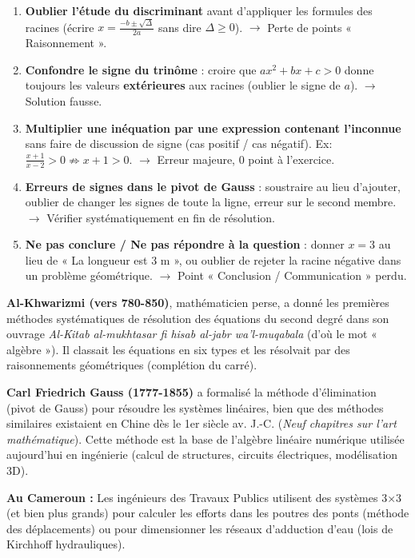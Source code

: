 \documentclass[11pt]{article}
\begin{document}
\begin{attention}
\begin{enumerate}
\item \textbf{Oublier l'étude du discriminant} avant d'appliquer les formules des racines (écrire $x = \frac{-b \pm \sqrt{\Delta}}{2a}$ sans dire $\Delta \ge 0$). $\rightarrow$ Perte de points « Raisonnement ».
\item \textbf{Confondre le signe du trinôme} : croire que $ax^2+bx+c > 0$ donne toujours les valeurs \textbf{extérieures} aux racines (oublier le signe de $a$). $\rightarrow$ Solution fausse.
\item \textbf{Multiplier une inéquation par une expression contenant l'inconnue} sans faire de discussion de signe (cas positif / cas négatif). Ex: $\frac{x+1}{x-2} > 0 \not\Rightarrow x+1 > 0$. $\rightarrow$ Erreur majeure, 0 point à l'exercice.
\item \textbf{Erreurs de signes dans le pivot de Gauss} : soustraire au lieu d'ajouter, oublier de changer les signes de toute la ligne, erreur sur le second membre. $\rightarrow$ Vérifier systématiquement en fin de résolution.
\item \textbf{Ne pas conclure / Ne pas répondre à la question} : donner $x=3$ au lieu de « La longueur est 3 m », ou oublier de rejeter la racine négative dans un problème géométrique. $\rightarrow$ Point « Conclusion / Communication » perdu.
\end{enumerate}
\end{attention}

\begin{savaistu}
\textbf{Al-Khwarizmi (vers 780-850)}, mathématicien perse, a donné les premières méthodes systématiques de résolution des équations du second degré dans son ouvrage \emph{Al-Kitab al-mukhtasar fi hisab al-jabr wa'l-muqabala} (d'où le mot « algèbre »). Il classait les équations en six types et les résolvait par des raisonnements géométriques (complétion du carré).

\textbf{Carl Friedrich Gauss (1777-1855)} a formalisé la méthode d'élimination (pivot de Gauss) pour résoudre les systèmes linéaires, bien que des méthodes similaires existaient en Chine dès le 1er siècle av. J.-C. (\emph{Neuf chapitres sur l'art mathématique}). Cette méthode est la base de l'algèbre linéaire numérique utilisée aujourd'hui en ingénierie (calcul de structures, circuits électriques, modélisation 3D).

\textbf{Au Cameroun :} Les ingénieurs des Travaux Publics utilisent des systèmes 3×3 (et bien plus grands) pour calculer les efforts dans les poutres des ponts (méthode des déplacements) ou pour dimensionner les réseaux d'adduction d'eau (lois de Kirchhoff hydrauliques).
\end{savaistu}
\end{document}
